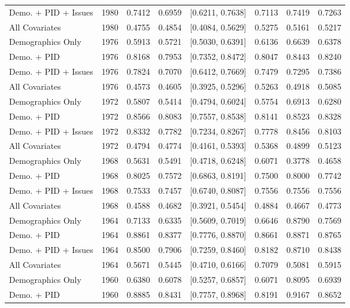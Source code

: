 \begin{longtable}{lrrrlrrr}
  Demo. + PID + Issues & 1980 & 0.7412 & 0.6959 & [0.6211, 0.7638] & 0.7113 & 0.7419 & 0.7263 \\ 
  All Covariates & 1980 & 0.4755 & 0.4854 & [0.4084, 0.5629] & 0.5275 & 0.5161 & 0.5217 \\ 
  Demographics Only & 1976 & 0.5913 & 0.5721 & [0.5030, 0.6391] & 0.6136 & 0.6639 & 0.6378 \\ 
  Demo. + PID & 1976 & 0.8168 & 0.7953 & [0.7352, 0.8472] & 0.8047 & 0.8443 & 0.8240 \\ 
  Demo. + PID + Issues & 1976 & 0.7824 & 0.7070 & [0.6412, 0.7669] & 0.7479 & 0.7295 & 0.7386 \\ 
  All Covariates & 1976 & 0.4573 & 0.4605 & [0.3925, 0.5296] & 0.5263 & 0.4918 & 0.5085 \\ 
  Demographics Only & 1972 & 0.5807 & 0.5414 & [0.4794, 0.6024] & 0.5754 & 0.6913 & 0.6280 \\ 
  Demo. + PID & 1972 & 0.8566 & 0.8083 & [0.7557, 0.8538] & 0.8141 & 0.8523 & 0.8328 \\ 
  Demo. + PID + Issues & 1972 & 0.8332 & 0.7782 & [0.7234, 0.8267] & 0.7778 & 0.8456 & 0.8103 \\ 
  All Covariates & 1972 & 0.4794 & 0.4774 & [0.4161, 0.5393] & 0.5368 & 0.4899 & 0.5123 \\ 
  Demographics Only & 1968 & 0.5631 & 0.5491 & [0.4718, 0.6248] & 0.6071 & 0.3778 & 0.4658 \\ 
  Demo. + PID & 1968 & 0.8025 & 0.7572 & [0.6863, 0.8191] & 0.7500 & 0.8000 & 0.7742 \\ 
  Demo. + PID + Issues & 1968 & 0.7533 & 0.7457 & [0.6740, 0.8087] & 0.7556 & 0.7556 & 0.7556 \\ 
  All Covariates & 1968 & 0.4588 & 0.4682 & [0.3921, 0.5454] & 0.4884 & 0.4667 & 0.4773 \\ 
  Demographics Only & 1964 & 0.7133 & 0.6335 & [0.5609, 0.7019] & 0.6646 & 0.8790 & 0.7569 \\ 
  Demo. + PID & 1964 & 0.8861 & 0.8377 & [0.7776, 0.8870] & 0.8661 & 0.8871 & 0.8765 \\ 
  Demo. + PID + Issues & 1964 & 0.8500 & 0.7906 & [0.7259, 0.8460] & 0.8182 & 0.8710 & 0.8438 \\ 
  All Covariates & 1964 & 0.5671 & 0.5445 & [0.4710, 0.6166] & 0.7079 & 0.5081 & 0.5915 \\ 
  Demographics Only & 1960 & 0.6380 & 0.6078 & [0.5257, 0.6857] & 0.6071 & 0.8095 & 0.6939 \\ 
  Demo. + PID & 1960 & 0.8885 & 0.8431 & [0.7757, 0.8968] & 0.8191 & 0.9167 & 0.8652 \\ 

\end{longtable}
